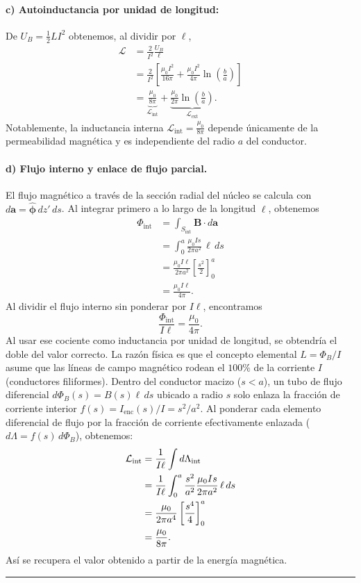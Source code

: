 \documentclass[11pt]{article}
\begin{document}
\paragraph{c) Autoinductancia por unidad de longitud:}
De $U_B=\tfrac12 LI^2$ obtenemos, al dividir por $\ell$,
\begin{align*}
    \mathcal L
    &=\frac{2}{I^2}\frac{U_B}{\ell}\\
    &=\frac{2}{I^2}\left[
       \frac{\mu_0 I^2}{16\pi}
       +\frac{\mu_0 I^2}{4\pi}\ln\!\left(\frac{b}{a}\right)\right]\\
    &=\underbrace{\frac{\mu_0}{8\pi}}_{\mathcal L_{\mathrm{int}}}
      +\underbrace{\frac{\mu_0}{2\pi}\ln\!\left(\frac{b}{a}\right)}
       _{\mathcal L_{\mathrm{ext}}}.
\end{align*}
Notablemente, la inductancia interna $\mathcal{L}_{\text{int}} = \frac{\mu_0}{8\pi}$ depende únicamente de la permeabilidad magnética y es independiente del radio $a$ del conductor.

\paragraph{d) Flujo interno y enlace de flujo parcial.}
El flujo magnético a través de la sección radial del núcleo se
calcula con $d\mathbf a=\hat{\boldsymbol\phi}\,dz'\,ds$.
Al integrar primero a lo largo de la longitud $\ell$, obtenemos
\begin{align*}
    \Phi_{\mathrm{int}}
    &=\int_{S_{\mathrm{int}}}\mathbf B\cdot d\mathbf a\\
    &=\int_0^a\frac{\mu_0 I s}{2\pi a^2}\,\ell\,ds\\
    &=\frac{\mu_0 I\ell}{2\pi a^2}
      \left[\frac{s^2}{2}\right]_0^a\\
    &=\frac{\mu_0 I\ell}{4\pi}.
\end{align*}
Al dividir el flujo interno sin ponderar por $I\ell$, encontramos
\[
    \frac{\Phi_{\mathrm{int}}}{I\ell}=\frac{\mu_0}{4\pi}.
\]
Al usar ese cociente como inductancia por unidad de longitud,
se obtendría el doble del valor correcto. La razón física es que el concepto elemental $L = \Phi_B/I$ asume que las líneas de campo magnético rodean el $100\%$ de la corriente $I$ (conductores filiformes). Dentro del conductor macizo ($s < a$), un tubo de flujo diferencial $d\Phi_B(s) = B(s)\ell\, ds$ ubicado a radio $s$ solo enlaza la fracción de corriente interior $f(s) = I_{\text{enc}}(s)/I = s^2/a^2$. Al ponderar cada elemento diferencial de flujo por la fracción de corriente efectivamente enlazada ($d\Lambda = f(s)\, d\Phi_B$), obtenemos:
\begin{align}
    \mathcal L_{\mathrm{int}}
    &=\frac{1}{I\ell}\int d\Lambda_{\mathrm{int}}
      \notag\\
    &=\frac{1}{I\ell}\int_0^a
      \frac{s^2}{a^2}\frac{\mu_0 I s}{2\pi a^2}\,\ell\,ds
      \notag\\
    &=\frac{\mu_0}{2\pi a^4}
      \left[\frac{s^4}{4}\right]_0^a
      \notag\\
    &=\frac{\mu_0}{8\pi}.
\end{align}
Así se recupera el valor obtenido a partir de la energía magnética.
\vspace{0.4cm}
\hrule
\vspace{0.5cm}
\end{document}
